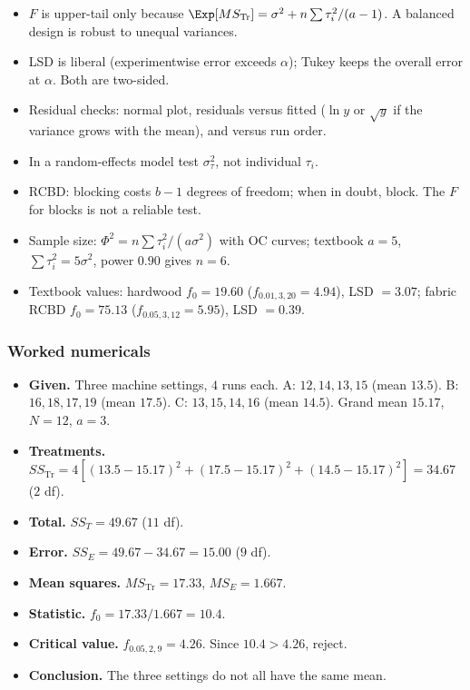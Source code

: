 \begin{notebox}
\begin{itemize}
  \item $F$ is upper-tail only because $\Exp[MS_{\text{Tr}}]=\sigma^2+n\sum\tau_i^2/(a-1)$. A balanced design is robust to unequal variances.
  \item LSD is liberal (experimentwise error exceeds $\alpha$); Tukey keeps the overall error at $\alpha$. Both are two-sided.
  \item Residual checks: normal plot, residuals versus fitted ($\ln y$ or $\sqrt{y}$ if the variance grows with the mean), and versus run order.
  \item In a random-effects model test $\sigma_\tau^2$, not individual $\tau_i$.
  \item RCBD: blocking costs $b-1$ degrees of freedom; when in doubt, block. The $F$ for blocks is not a reliable test.
  \item Sample size: $\Phi^2=n\sum\tau_i^2/(a\sigma^2)$ with OC curves; textbook $a=5$, $\sum\tau_i^2=5\sigma^2$, power $0.90$ gives $n=6$.
  \item Textbook values: hardwood $f_0=19.60$ ($f_{0.01,3,20}=4.94$), LSD $=3.07$; fabric RCBD $f_0=75.13$ ($f_{0.05,3,12}=5.95$), LSD $=0.39$.
\end{itemize}
\end{notebox}

\subsubsection*{Worked numericals}

\begin{example}
\begin{itemize}
  \item \textbf{Given.} Three machine settings, $4$ runs each. A: $12,14,13,15$ (mean $13.5$). B: $16,18,17,19$ (mean $17.5$). C: $13,15,14,16$ (mean $14.5$). Grand mean $15.17$, $N=12$, $a=3$.
  \item \textbf{Treatments.} $SS_{\text{Tr}}=4[(13.5-15.17)^2+(17.5-15.17)^2+(14.5-15.17)^2]=34.67$ ($2$ df).
  \item \textbf{Total.} $SS_T=49.67$ ($11$ df).
  \item \textbf{Error.} $SS_E=49.67-34.67=15.00$ ($9$ df).
  \item \textbf{Mean squares.} $MS_{\text{Tr}}=17.33$, $MS_E=1.667$.
  \item \textbf{Statistic.} $f_0=17.33/1.667=10.4$.
  \item \textbf{Critical value.} $f_{0.05,2,9}=4.26$. Since $10.4>4.26$, reject.
  \item \textbf{Conclusion.} The three settings do not all have the same mean.
\end{itemize}
\end{example}

